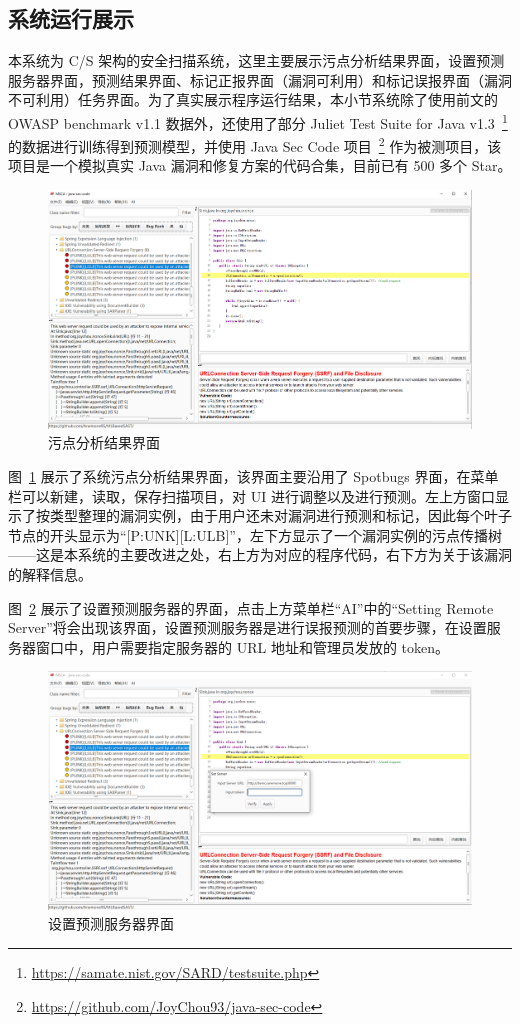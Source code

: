 \subsection{系统运行展示}

本系统为 C/S 架构的安全扫描系统，这里主要展示污点分析结果界面，设置预测服务器界面，预测结果界面、标记正报界面（漏洞可利用）和标记误报界面（漏洞不可利用）任务界面。为了真实展示程序运行结果，本小节系统除了使用前文的 OWASP benchmark v1.1 数据外，还使用了部分 Juliet Test Suite for Java v1.3~\footnote{\url{https://samate.nist.gov/SARD/testsuite.php}} 的数据进行训练得到预测模型，并使用 Java Sec Code 项目~\footnote{\url{https://github.com/JoyChou93/java-sec-code}} 作为被测项目，该项目是一个模拟真实 Java 漏洞和修复方案的代码合集，目前已有 500 多个 Star。

\begin{figure}[H]
    \centering
    \includegraphics[width=0.8\linewidth]{FIGs/chapter4/taintAnalysis.png}
    \caption{污点分析结果界面}\label{show:taint}
\end{figure} 

图~\ref{show:taint} 展示了系统污点分析结果界面，该界面主要沿用了 Spotbugs 界面，在菜单栏可以新建，读取，保存扫描项目，对 UI 进行调整以及进行预测。左上方窗口显示了按类型整理的漏洞实例，由于用户还未对漏洞进行预测和标记，因此每个叶子节点的开头显示为“[P:UNK][L:ULB]”，左下方显示了一个漏洞实例的污点传播树——这是本系统的主要改进之处，右上方为对应的程序代码，右下方为关于该漏洞的解释信息。

图~\ref{show:settingServer} 展示了设置预测服务器的界面，点击上方菜单栏“AI”中的“Setting Remote Server”将会出现该界面，设置预测服务器是进行误报预测的首要步骤，在设置服务器窗口中，用户需要指定服务器的 URL 地址和管理员发放的 token。

 \begin{figure}[H]
     \centering
     \includegraphics[width=0.8\linewidth]{FIGs/chapter4/settingServer.png}
     \caption{设置预测服务器界面}\label{show:settingServer}
 \end{figure} 

